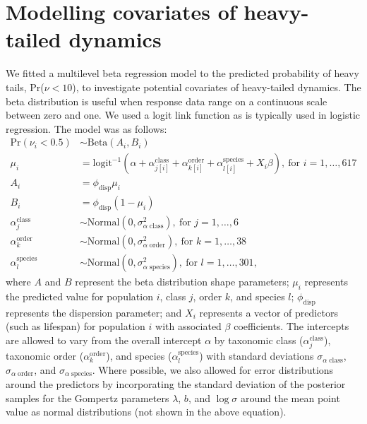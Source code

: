 \section{Modelling covariates of heavy-tailed dynamics}

We fitted a multilevel beta regression model to the predicted probability of
heavy tails, Pr($\nu < 10$), to investigate potential covariates of heavy-tailed
dynamics. The beta distribution is useful when response data range on
a continuous scale between zero and one. We used a logit link function as is
typically used in logistic regression. The model was as follows:
\begin{align*}
\mathrm{Pr}(\nu_i < 0.5) &\sim \mathrm{Beta}(A_i, B_i)\\
\mu_i &= \mathrm{logit}^{-1}(\alpha
  + \alpha^\mathrm{class}_{j[i]}
  + \alpha^\mathrm{order}_{k[i]}
  + \alpha^\mathrm{species}_{l[i]}
  + X_i \beta),
  \: \text{for } i = 1, \dots, 617\\
A_i &= \phi_\mathrm{disp} \mu_i\\
B_i &= \phi_\mathrm{disp} (1 - \mu_i)\\
\alpha^\mathrm{class}_j &\sim
  \mathrm{Normal}(0, \sigma^2_{\alpha \; \mathrm{class}}),
  \: \text{for } j = 1, \dots, 6\\
\alpha^\mathrm{order}_k &\sim
  \mathrm{Normal}(0, \sigma^2_{\alpha \; \mathrm{order}}),
  \: \text{for } k = 1, \dots, 38\\
\alpha^\mathrm{species}_l &\sim
  \mathrm{Normal}(0, \sigma^2_{\alpha \; \mathrm{species}}),
  \: \text{for } l = 1, \dots, 301,
\end{align*}
where $A$ and $B$ represent the beta distribution shape parameters; $\mu_i$
represents the predicted value for population $i$, class $j$, order $k$, and
species $l$; $\phi_\mathrm{disp}$ represents the dispersion parameter; and $X_i$
represents a vector of predictors (such as lifespan) for population $i$ with
associated $\beta$ coefficients. The intercepts are allowed to vary from the
overall intercept $\alpha$ by taxonomic class ($\alpha^\mathrm{class}_j$),
taxonomic order ($\alpha^\mathrm{order}_k$), and species
($\alpha^\mathrm{species}_l$) with standard deviations $\sigma_{\alpha \;
  \mathrm{class}}$, $\sigma_{\alpha \; \mathrm{order}}$, and $\sigma_{\alpha \;
  \mathrm{species}}$. Where possible, we also allowed for error distributions
around the predictors by incorporating the standard deviation of the posterior
samples for the Gompertz parameters $\lambda$, $b$, and $\log \sigma$ around the
mean point value as normal distributions (not shown in the above equation).

